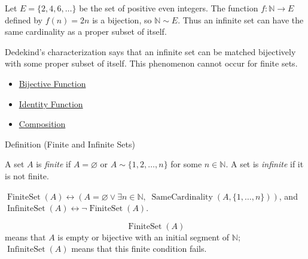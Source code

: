 \begin{remark*}[Exposition]
Let $E=\{2,4,6,\dots\}$ be the set of positive even integers. The function
$f:\mathbb{N}\to E$ defined by $f(n)=2n$ is a bijection, so
$\mathbb{N}\sim E$. Thus an infinite set can have the same cardinality as a
proper subset of itself.
\end{remark*}

\begin{remark*}[Exposition]
Dedekind's characterization says that an infinite set can be matched
bijectively with some proper subset of itself. This phenomenon cannot occur
for finite sets.
\end{remark*}

\begin{dependencies}
\begin{itemize}
  \item \hyperref[def:bijective]{Bijective Function}
  \item \hyperref[def:identity]{Identity Function}
  \item \hyperref[def:composition]{Composition}
\end{itemize}
\end{dependencies}


\begin{definitionbox}{Definition (Finite and Infinite Sets)}
\begin{definition}\label{def:finite-infinite}
A set $A$ is \emph{finite} if $A=\varnothing$ or
$A\sim\{1,2,\dots,n\}$ for some $n\in\mathbb{N}$. A set is \emph{infinite}
if it is not finite.
\end{definition}
\end{definitionbox}

\begin{remark*}
$\operatorname{FiniteSet}(A)\leftrightarrow
(A=\varnothing\vee \exists n\in\mathbb{N},\;
\operatorname{SameCardinality}(A,\{1,\dots,n\}))$, and
$\operatorname{InfiniteSet}(A)\leftrightarrow\neg\operatorname{FiniteSet}(A)$.
\end{remark*}

\begin{remark*}
\[
  \operatorname{FiniteSet}(A)
\] means that $A$ is empty or bijective with an
initial segment of $\mathbb{N}$; $\operatorname{InfiniteSet}(A)$ means that
this finite condition fails.
\end{remark*}

